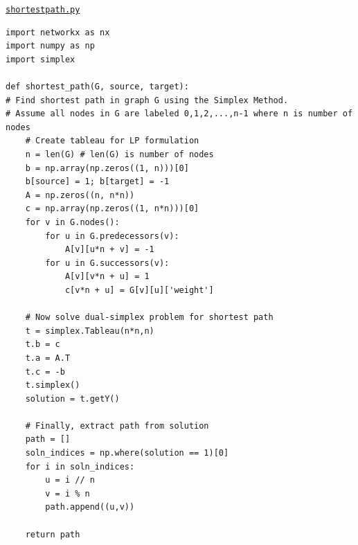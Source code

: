 \newpage
\underline{\texttt{shortestpath.py}}
\begin{verbatim}
import networkx as nx
import numpy as np
import simplex

def shortest_path(G, source, target):
# Find shortest path in graph G using the Simplex Method.
# Assume all nodes in G are labeled 0,1,2,...,n-1 where n is number of nodes
    # Create tableau for LP formulation
    n = len(G) # len(G) is number of nodes
    b = np.array(np.zeros((1, n)))[0]
    b[source] = 1; b[target] = -1
    A = np.zeros((n, n*n))
    c = np.array(np.zeros((1, n*n)))[0]
    for v in G.nodes():
        for u in G.predecessors(v):
            A[v][u*n + v] = -1
        for u in G.successors(v):
            A[v][v*n + u] = 1
            c[v*n + u] = G[v][u]['weight']

    # Now solve dual-simplex problem for shortest path
    t = simplex.Tableau(n*n,n)
    t.b = c
    t.a = A.T
    t.c = -b
    t.simplex()
    solution = t.getY()

    # Finally, extract path from solution
    path = []
    soln_indices = np.where(solution == 1)[0]
    for i in soln_indices:
        u = i // n
        v = i % n
        path.append((u,v))
    
    return path
\end{verbatim}

